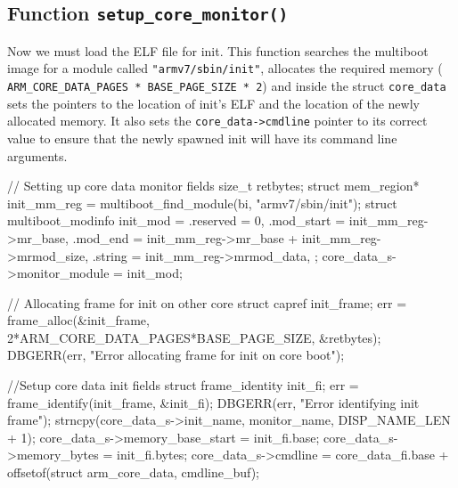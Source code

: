 \documentclass[a4paper,twoside,openright]{report}
\renewcommand{\t}[1]{%
	{\texttt{#1}}}
\begin{document}
\subsection{Function \t{setup\_core\_monitor()}}
Now we must load the ELF file for init. This function searches the multiboot
image for a module called \t{"armv7/sbin/init"}, allocates the required memory
(\t{ARM\_CORE\_DATA\_PAGES * BASE\_PAGE\_SIZE * 2}) and inside the struct
\t{core\_data} sets the pointers to the location of init's ELF and the location
of the newly allocated memory. It also sets the \t{core\_data->cmdline} pointer
to its correct value to ensure that the newly spawned init will have its
command line arguments.

\begin{pandacode}
	// Setting up core data monitor fields
	size_t retbytes;
	struct mem_region* init_mm_reg = multiboot_find_module(bi, "armv7/sbin/init");
	struct multiboot_modinfo init_mod = {
		.reserved   = 0,
		.mod_start  = init_mm_reg->mr_base, 
		.mod_end    = init_mm_reg->mr_base + init_mm_reg->mrmod_size,
		.string     = init_mm_reg->mrmod_data,
	};
	core_data_s->monitor_module     = init_mod;
	
	// Allocating frame for init on other core
	struct capref init_frame; 
	err = frame_alloc(&init_frame, 2*ARM_CORE_DATA_PAGES*BASE_PAGE_SIZE, &retbytes);
	DBGERR(err, "Error allocating frame for init on core boot\n");
	
	//Setup core data init fields
	struct frame_identity init_fi;
	err = frame_identify(init_frame, &init_fi);
	DBGERR(err, "Error identifying init frame\n");
	strncpy(core_data_s->init_name, monitor_name, DISP_NAME_LEN + 1);
	core_data_s->memory_base_start = init_fi.base;
	core_data_s->memory_bytes = init_fi.bytes;
	core_data_s->cmdline = core_data_fi.base + offsetof(struct arm_core_data, cmdline_buf);
\end{pandacode}
\end{document}
